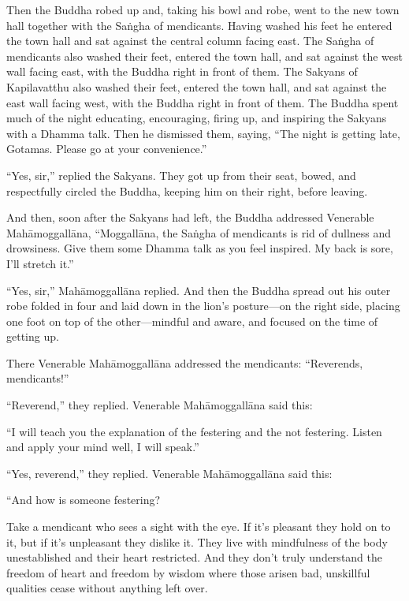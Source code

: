 \documentclass[12pt,openany]{book}%
\begin{document}
Then the Buddha robed up and, taking his bowl and robe, went to the new town hall together with the \textsanskrit{Saṅgha} of mendicants. Having washed his feet he entered the town hall and sat against the central column facing east. The \textsanskrit{Saṅgha} of mendicants also washed their feet, entered the town hall, and sat against the west wall facing east, with the Buddha right in front of them. The Sakyans of Kapilavatthu also washed their feet, entered the town hall, and sat against the east wall facing west, with the Buddha right in front of them. The Buddha spent much of the night educating, encouraging, firing up, and inspiring the Sakyans with a Dhamma talk. Then he dismissed them, saying, “The night is getting late, Gotamas. Please go at your convenience.” 

“Yes, sir,” replied the Sakyans. They got up from their seat, bowed, and respectfully circled the Buddha, keeping him on their right, before leaving. 

And then, soon after the Sakyans had left, the Buddha addressed Venerable \textsanskrit{Mahāmoggallāna}, “\textsanskrit{Moggallāna}, the \textsanskrit{Saṅgha} of mendicants is rid of dullness and drowsiness. Give them some Dhamma talk as you feel inspired. My back is sore, I’ll stretch it.” 

“Yes, sir,” \textsanskrit{Mahāmoggallāna} replied. And then the Buddha spread out his outer robe folded in four and laid down in the lion’s posture—on the right side, placing one foot on top of the other—mindful and aware, and focused on the time of getting up. 

There Venerable \textsanskrit{Mahāmoggallāna} addressed the mendicants: “Reverends, mendicants!” 

“Reverend,” they replied. Venerable \textsanskrit{Mahāmoggallāna} said this: 

“I will teach you the explanation of the festering and the not festering. Listen and apply your mind well, I will speak.” 

“Yes, reverend,” they replied. Venerable \textsanskrit{Mahāmoggallāna} said this: 

“And how is someone festering? 

Take a mendicant who sees a sight with the eye. If it’s pleasant they hold on to it, but if it’s unpleasant they dislike it. They live with mindfulness of the body unestablished and their heart restricted. And they don’t truly understand the freedom of heart and freedom by wisdom where those arisen bad, unskillful qualities cease without anything left over. 
\end{document}
